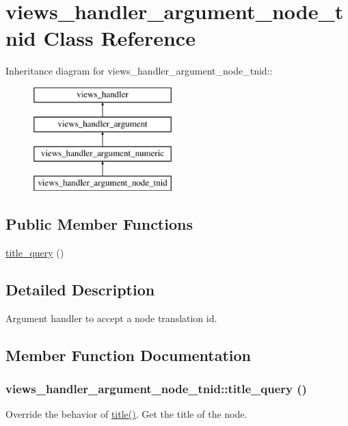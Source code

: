 \hypertarget{classviews__handler__argument__node__tnid}{
\section{views\_\-handler\_\-argument\_\-node\_\-tnid Class Reference}
\label{classviews__handler__argument__node__tnid}
}
Inheritance diagram for views\_\-handler\_\-argument\_\-node\_\-tnid::\begin{figure}[H]
\begin{center}
\leavevmode
\includegraphics[height=4cm]{classviews__handler__argument__node__tnid}
\end{center}
\end{figure}
\subsection*{Public Member Functions}
\begin{DoxyCompactItemize}
\item 
\hyperlink{classviews__handler__argument__node__tnid_a4b22c61185c2c55b8fbfe40b4e131d69}{title\_\-query} ()
\end{DoxyCompactItemize}


\subsection{Detailed Description}
Argument handler to accept a node translation id. 

\subsection{Member Function Documentation}
\hypertarget{classviews__handler__argument__node__tnid_a4b22c61185c2c55b8fbfe40b4e131d69}{
\subsubsection[{title\_\-query}]{\setlength{\rightskip}{0pt plus 5cm}views\_\-handler\_\-argument\_\-node\_\-tnid::title\_\-query ()}}
\label{classviews__handler__argument__node__tnid_a4b22c61185c2c55b8fbfe40b4e131d69}
Override the behavior of \hyperlink{classviews__handler__argument__numeric_a480758dbcde899b5483b091e51e2bf39}{title()}. Get the title of the node. 

